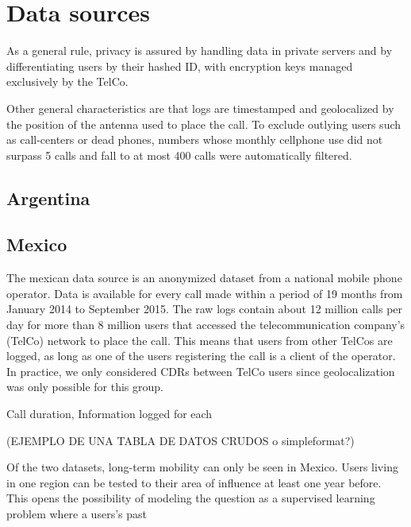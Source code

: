 \section{Data sources}

As a general rule, privacy is assured by handling data in private servers and by differentiating users by their hashed ID, with encryption keys managed exclusively by the TelCo.

Other general characteristics are that logs are timestamped and geolocalized by the position of the antenna used to place the call. To exclude outlying users such as call-centers or dead phones, numbers whose monthly cellphone use did not surpass 5 calls and fall to at most 400 calls were automatically filtered.

\subsection{Argentina}

\subsection{Mexico}

The mexican data source is an anonymized dataset from a national mobile phone operator. Data is available for every call made within a period of 19 months from January 2014 to September 2015. The raw logs contain about 12 million calls per day for more than 8 million users that accessed the telecommunication company's (TelCo) network to place the call. This means that users from other TelCos are logged, as long as one of the users registering the call is a client of the operator. In practice, we only considered CDRs between TelCo users since geolocalization was only possible for this group.

Call duration, Information logged for each

(EJEMPLO DE UNA TABLA DE DATOS CRUDOS o simpleformat?)

Of the two datasets, long-term mobility can only be seen in Mexico. Users living in one region can be tested to their area of influence at least one year before. This opens the possibility of modeling the question as a supervised learning problem where a users's past 



